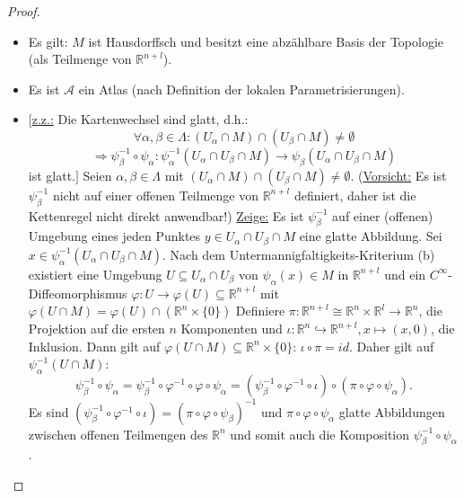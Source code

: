 \documentclass[a4paper,11pt,notitlepage]{report}
\theoremstyle{definition}
\newcommand{\R}{{\ensuremath{\mathbb{R}}}}
\begin{document}
\begin{proof}
	\begin{itemize}
		\item Es gilt: $M$ ist Hausdorffsch und besitzt eine abzählbare Basis der Topologie (als Teilmenge von $\R^{n+l}$).
		\item Es ist $\mathcal{A}$ ein Atlas (nach Definition der lokalen Parametrisierungen).
		\item $[$\underline{z.z.:} Die Kartenwechsel sind glatt, d.h.: 
			$$\forall \alpha, \beta \in \Lambda \colon (U_\alpha \cap M) \cap (U_\beta \cap M) \neq \emptyset$$
			$$\Rightarrow \psi_\beta^{-1} \circ \psi_\alpha \colon \psi_\alpha^{-1}(U_\alpha \cap U_\beta \cap M) \rightarrow \psi_\beta(U_\alpha \cap U_\beta \cap M)$$
			 ist glatt.$]$ \newline
			Seien $\alpha, \beta \in \Lambda$ mit $(U_\alpha \cap M) \cap (U_\beta \cap M) \neq \emptyset$.
			\newline
			(\underline{Vorsicht:} Es ist $\psi_\beta^{-1}$ nicht auf einer offenen Teilmenge von $\R^{n+l}$ definiert, daher ist die Kettenregel nicht direkt anwendbar!)
			\newline
			\underline{Zeige:} Es ist $\psi_\beta^{-1}$ auf einer (offenen) Umgebung eines jeden Punktes $y \in U_\alpha \cap U_\beta \cap M$ eine glatte Abbildung.
			\newline
			Sei $x \in \psi_\alpha^{-1}(U_\alpha \cap U_\beta \cap M)$. Nach dem Untermannigfaltigkeits-Kriterium (b) existiert eine Umgebung $U \subseteq U_\alpha \cap U_\beta$ von $\psi_\alpha(x) \in M$ in $\R^{n+l}$ und ein $C^\infty$-Diffeomorphismus $\varphi \colon U \rightarrow \varphi(U) \subseteq \R^{n+l}$ mit $\varphi(U \cap M) = \varphi(U) \cap (\R^{n} \times \{0\})$
			\newline
			Definiere $\pi \colon \R^{n+l} \cong \R^n \times \R^l \rightarrow \R^n$, die Projektion auf die ersten $n$ Komponenten und $\iota \colon \R^n \hookrightarrow \R^{n+l}, x \mapsto (x,0)$, die Inklusion. Dann gilt auf $\varphi(U \cap M) \subseteq \R^{n} \times \{0\}$: $\iota \circ \pi = id$. Daher gilt auf $\psi_\alpha^{-1}(U \cap M)$: 
			$$\psi_\beta^{-1} \circ \psi_\alpha = \psi_\beta^{-1} \circ \varphi^{-1} \circ \varphi \circ \psi_\alpha = (\psi_\beta^{-1} \circ \varphi^{-1} \circ \iota)\circ(\pi \circ \varphi \circ \psi_\alpha).$$
			Es sind $(\psi_\beta^{-1} \circ \varphi^{-1} \circ \iota) = (\pi \circ \varphi \circ \psi_\beta)^{-1}$ und $\pi \circ \varphi \circ \psi_\alpha$ glatte Abbildungen zwischen offenen Teilmengen des $\R^n$ und somit auch die Komposition $\psi_\beta^{-1} \circ \psi_\alpha$.
	\end{itemize}
\end{proof}
\end{document}
